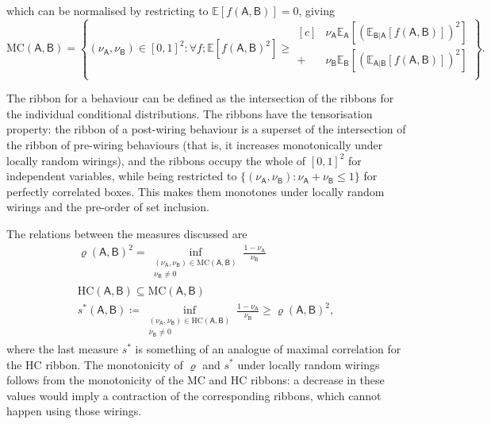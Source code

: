 \documentclass[10pt, a4paper]{article}
\numberwithin{equation}{section} %
\theoremstyle{definition}
\theoremstyle{plain}
\newcommand{\st}{\mathrel{:}} %
\newcommand{\?}{\mathrel{?}} %
\newcommand{\E}{\mathbb{E}} %
\newcommand{\crv}[1]{\mathsf{#1}}
\newcommand{\HC}{\mathrm{HC}}
\newcommand{\MC}{\mathrm{MC}}
\begin{document}
                        which can be normalised by restricting to \(\E[f(\crv{A},\crv{B})] = 0\), giving
                        \begin{equation}
                          \MC(\crv{A},\crv{B}) = \left\{(\nu_{\crv{A}}, \nu_{\crv{B}}) \in {[0,1]}^2 \st \forall f; \E[{f(\crv{A},\crv{B})}^2] \geq 
                            \begin{aligned}[c]
          & \nu_{\crv{A}} \E_{\crv{A}}[{(\E_{\crv{B}|\crv{A}}[f(\crv{A},\crv{B})])}^2] \\ + & \nu_{\crv{B}} \E_{\crv{B}}[{(\E_{\crv{A}|\crv{B}}[f(\crv{A},\crv{B})])}^2] \\
                            \end{aligned}
                          \right\}.
                        \end{equation}

                        The ribbon for a behaviour can be defined as the intersection of the ribbons for the individual conditional distributions. The ribbons have the tensorisation property: the ribbon of a post-wiring behaviour is a superset of the intersection of the ribbon of pre-wiring behaviours (that is, it increases monotonically under locally random wirings), and the ribbons occupy the whole of \({[0,1]}^2\) for independent variables, while being restricted to \(\{(\nu_{\crv{A}}, \nu_{\crv{B}}) \st \nu_{\crv{A}} + \nu_{\crv{B}} \leq 1\}\) for perfectly correlated boxes. This makes them monotones under locally random wirings and the pre-order of set inclusion.

                        The relations between the measures discussed are
                        \begin{gather}
                          {\varrho(\crv{A},\crv{B})}^2 = \inf_{\substack{(\nu_{\crv{A}}, \nu_{\crv{B}}) \in \MC(\crv{A},\crv{B}) \\ \nu_{\crv{B}} \neq 0}} \frac{1 - \nu_{\crv{A}}}{\nu_{\crv{B}}} \\
                          \HC(\crv{A},\crv{B}) \subseteq \MC(\crv{A},\crv{B}) \\
                          s^*(\crv{A},\crv{B}) \coloneqq \inf_{\substack{(\nu_{\crv{A}}, \nu_{\crv{B}}) \in \HC(\crv{A},\crv{B}) \\ \nu_{\crv{B}} \neq 0}} \frac{1 - \nu_{\crv{A}}}{\nu_{\crv{B}}} \geq {\varrho(\crv{A},\crv{B})}^2,
                        \end{gather}
                        where the last measure \(s^*\) is something of an analogue of maximal correlation for the HC ribbon. The monotonicity of \(\varrho\) and \(s^*\) under locally random wirings follows from the monotonicity of the MC and HC ribbons: a decrease in these values would imply a contraction of the corresponding ribbons, which cannot happen using those wirings.
\end{document}
